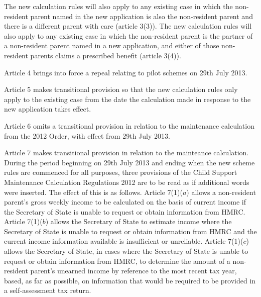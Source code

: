 \documentclass[12pt,a4paper]{article}
\begin{document}
The new calculation rules will also apply to any existing case in which the non-resident parent named in the new application is also the non-resident parent and there is a different parent with care (article 3(3)). The new calculation rules will also apply to any existing case in which the non-resident parent is the partner of a non-resident parent named in a new application, and either of those non-resident parents claims a prescribed benefit (article 3(4)).

Article 4 brings into force a repeal relating to pilot schemes on 29th July 2013.

Article 5 makes transitional provision so that the new calculation rules only apply to the existing case from the date the calculation made in response to the new application takes effect.

Article 6 omits a transitional provision in relation to the maintenance calculation from the 2012 Order, with effect from 29th July 2013.

Article 7 makes transitional provision in relation to the mainteance calculation. During the period beginning on 29th July 2013 and ending when the new scheme rules are commenced for all purposes, three provisions of the Child Support Maintenance Calculation Regulations 2012 are to be read as if additional words were inserted. The effect of this is as follows. Article 7(1)($a$)  allows a non-resident parent’s gross weekly income to be calculated on the basis of current income if the Secretary of State is unable to request or obtain information from HMRC. Article 7(1)($b$)  allows the Secretary of State to estimate income where the Secretary of State is unable to request or obtain information from HMRC and the current income information available is insufficient or unreliable. Article 7(1)($c$)  allows the Secretary of State, in cases where the Secretary of State is unable to request or obtain information from HMRC, to determine the amount of a non-resident parent’s unearned income by reference to the most recent tax year, based, as far as possible, on information that would be required to be provided in a self-assessment tax return. 
\end{document}

